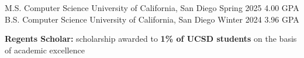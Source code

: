 

\begin{cventries}
\begin{comment}\cventrytwoalt
{M.S. Computer Science} %
{B.S. Cognitive Science (Specialization: Design and Interaction)} %
{University of California, San Diego} %
{3.96 GPA} %
{Fall 2020 - Winter 2024} %
{
  \begin{cvitems} %
    \item {\textbf{Regents Scholar:} scholarship awarded to \textbf{1\% of UCSD students} on the basis of academic excellence}
    \item {\textbf{Coursework:} Machine Learning, Interaction Design, Data Structures, Algorithms, Systems Design, Functional Programming}
  \end{cvitems}
}
\end{comment}

\cventry
  {M.S. Computer Science}
  {University of California, San Diego} %
  {Spring 2025} %
  {4.00 GPA} %
  {}
\vspace{-7pt}
\cventry
  {B.S. Computer Science}
  {University of California, San Diego} %
  {Winter 2024} %
  {3.96 GPA} %
  {
  \begin{cvitems} %
    \item {\textbf{Regents Scholar:} scholarship awarded to \textbf{1\% of UCSD students} on the basis of academic excellence}
  \end{cvitems}
  }

\end{cventries}
